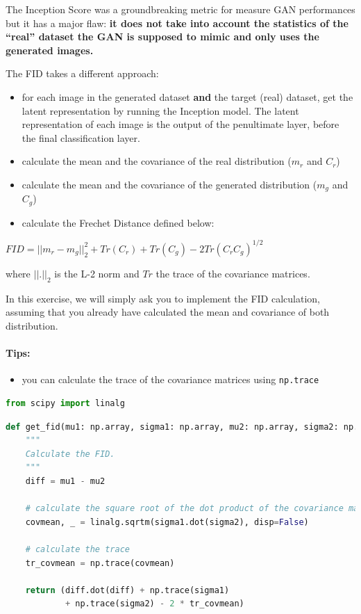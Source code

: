 The Inception Score was a groundbreaking metric for measure GAN
performances but it has a major flaw: \textbf{it does not take into
account the statistics of the ``real'' dataset the GAN is supposed to
mimic and only uses the generated images.} \newline

The FID takes a different approach: 
\begin{itemize}
    \item for each image in the generated dataset \textbf{and} the target (real) dataset, get the latent representation by running the Inception model. The latent representation of each image is the output of the penultimate layer, before the final classification layer.
    \item calculate the mean and the covariance of the real distribution (\(m_{r}\) and \(C_{r}\))
    \item calculate the mean and the covariance of the generated distribution (\(m_{g}\) and \(C_{g}\))
    \item calculate the Frechet Distance defined below:
\end{itemize}

\(FID = ||m_{r} - m_{g}||^{2}_{2} + Tr(C_{r}) + Tr(C_{g}) - 2 Tr(C_{r}C_{g})^{1/2}\)

where \(||.||_{2}\) is the L-2 norm and \(Tr\) the trace of the
covariance matrices. \newline

In this exercise, we will simply ask you to implement the FID
calculation, assuming that you already have calculated the mean and
covariance of both distribution.

\paragraph{Tips:}
\begin{itemize}
\item you can calculate the trace of the covariance matrices using \lstinline{np.trace}
\end{itemize}

\begin{lstlisting}[language=Python]
from scipy import linalg
\end{lstlisting}

\begin{lstlisting}[language=Python]
def get_fid(mu1: np.array, sigma1: np.array, mu2: np.array, sigma2: np.array):
    """
    Calculate the FID. 
    """
    diff = mu1 - mu2
    
    # calculate the square root of the dot product of the covariance matrices
    covmean, _ = linalg.sqrtm(sigma1.dot(sigma2), disp=False)
    
    # calculate the trace
    tr_covmean = np.trace(covmean)

    return (diff.dot(diff) + np.trace(sigma1)
            + np.trace(sigma2) - 2 * tr_covmean)
\end{lstlisting}


